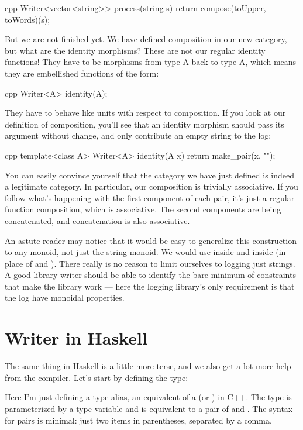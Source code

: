 \begin{snip}{cpp}
Writer<vector<string>> process(string s) {
    return compose(toUpper, toWords)(s);
}
\end{snip}
But we are not finished yet. We have defined composition in our new
category, but what are the identity morphisms? These are not our regular
identity functions! They have to be morphisms from type A back to type
A, which means they are embellished functions of the form:

\begin{snip}{cpp}
Writer<A> identity(A);
\end{snip}
They have to behave like units with respect to composition. If you look
at our definition of composition, you'll see that an identity morphism
should pass its argument without change, and only contribute an empty
string to the log:

\begin{snip}{cpp}
template<class A> Writer<A> identity(A x) {
    return make_pair(x, "");
}
\end{snip}
You can easily convince yourself that the category we have just defined
is indeed a legitimate category. In particular, our composition is
trivially associative. If you follow what's happening with the first
component of each pair, it's just a regular function composition, which
is associative. The second components are being concatenated, and
concatenation is also associative.

An astute reader may notice that it would be easy to generalize this
construction to any monoid, not just the string monoid. We would use
 inside  and  inside
 (in place of \code{+} and ). There really
is no reason to limit ourselves to logging just strings. A good library
writer should be able to identify the bare minimum of constraints that
make the library work --- here the logging library's only requirement is
that the log have monoidal properties.

\section{Writer in Haskell}

The same thing in Haskell is a little more terse, and we also get a lot
more help from the compiler. Let's start by defining the 
type:

Here I'm just defining a type alias, an equivalent of a 
(or ) in C++. The type  is parameterized by
a type variable  and is equivalent to a pair of  and
. The syntax for pairs is minimal: just two items in
parentheses, separated by a comma.

